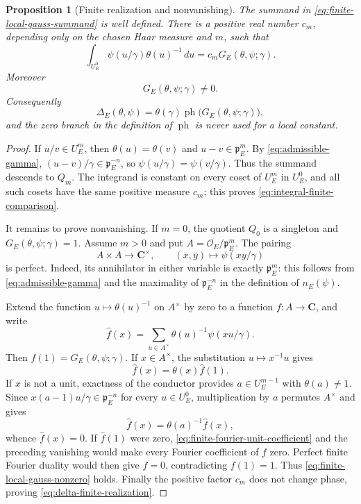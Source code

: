 \documentclass[11pt]{amsart}
\newtheorem{proposition}[theorem]{Proposition}
\theoremstyle{definition}
\theoremstyle{remark}
\newcommand{\C}{\mathbf C}
\newcommand{\cO}{\mathcal O}
\newcommand{\p}{\mathfrak p}
\newcommand{\ph}{\operatorname{ph}}
\begin{document}
\begin{proposition}[Finite realization and nonvanishing]
\label{prop:finite-local-realization}
The summand in \eqref{eq:finite-local-gauss-summand} is well defined.
There is a positive real number $c_m$, depending only on the chosen Haar
measure and $m$, such that
\begin{equation}\label{eq:integral-finite-comparison}
 \int_{U_E^0}\psi(u/\gamma)\theta(u)^{-1}\,du
 =c_m G_E(\theta,\psi;\gamma).
\end{equation}
Moreover
\begin{equation}\label{eq:finite-local-gauss-nonzero}
 G_E(\theta,\psi;\gamma)\ne0.
\end{equation}
Consequently
\begin{equation}\label{eq:delta-finite-realization}
 \Delta_E(\theta,\psi)
 =\theta(\gamma)\ph\bigl(G_E(\theta,\psi;\gamma)\bigr),
\end{equation}
and the zero branch in the definition of $\ph$ is never used for a
local constant.
\end{proposition}

\begin{proof}
If $u/v\in U_E^m$, then $\theta(u)=\theta(v)$ and
$u-v\in\p_E^m$.  By \eqref{eq:admissible-gamma},
$(u-v)/\gamma\in\p_E^{-n}$, so
$\psi(u/\gamma)=\psi(v/\gamma)$.  Thus the summand descends to
$Q_m$.  The integrand is constant on every coset of $U_E^m$ in
$U_E^0$, and all such cosets have the same positive measure $c_m$;
this proves \eqref{eq:integral-finite-comparison}.

It remains to prove nonvanishing.  If $m=0$, the quotient $Q_0$ is a
singleton and $G_E(\theta,\psi;\gamma)=1$.
Assume $m>0$ and put $A=\cO_E/\p_E^m$.  The pairing
\[
 A\times A\longrightarrow\C^\times,
 \qquad
 (\bar x,\bar y)\longmapsto\psi(xy/\gamma)
\]
is perfect.  Indeed, its annihilator in either variable is exactly
$\p_E^m$: this follows from \eqref{eq:admissible-gamma} and the
maximality of $\p_E^{-n}$ in the definition of $n_E(\psi)$.

Extend the function $u\mapsto\theta(u)^{-1}$ on $A^\times$ by zero
to a function $f:A\to\C$, and write
\[
 \widehat f(x)=
 \sum_{u\in A^\times}\theta(u)^{-1}\psi(xu/\gamma).
\]
Then $\widehat f(1)=G_E(\theta,\psi;\gamma)$.  If $x\in A^\times$,
the substitution $u\mapsto x^{-1}u$ gives
\begin{equation}\label{eq:finite-fourier-unit-coefficient}
 \widehat f(x)=\theta(x)\widehat f(1).
\end{equation}
If $x$ is not a unit, exactness of the conductor provides
$a\in U_E^{m-1}$ with $\theta(a)\ne1$.  Since
$x(a-1)u/\gamma\in\p_E^{-n}$ for every $u\in U_E^0$, multiplication
by $a$ permutes $A^\times$ and gives
\[
 \widehat f(x)=\theta(a)^{-1}\widehat f(x),
\]
whence $\widehat f(x)=0$.  If $\widehat f(1)$ were zero,
\eqref{eq:finite-fourier-unit-coefficient} and the preceding vanishing
would make every Fourier coefficient of $f$ zero.  Perfect finite
Fourier duality would then give $f=0$, contradicting $f(1)=1$.
Thus \eqref{eq:finite-local-gauss-nonzero} holds.  Finally the positive
factor $c_m$ does not change phase, proving
\eqref{eq:delta-finite-realization}.
\end{proof}
\end{document}

